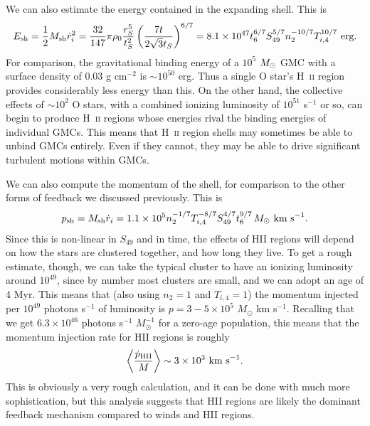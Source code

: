 We can also estimate the energy contained in the expanding shell. This is
\begin{equation}
E_{\rm sh} = \frac{1}{2} M_{\rm sh} \dot{r}_i^2 = \frac{32}{147}\pi \rho_0 \frac{r_S^5}{t_S^2} \left(\frac{7t}{2\sqrt{3} t_S}\right)^{6/7}
=8.1\times 10^{47} t_6^{6/7} S_{49}^{5/7} n_2^{-10/7} T_{i,4}^{10/7}\mbox{ erg}.
\end{equation}
For comparison, the gravitational binding energy of a $10^5$ $M_{\odot}$ GMC with a surface density of $0.03$ g cm$^{-2}$ is $\sim 10^{50}$ erg. Thus a single O star's H~\textsc{ii} region provides considerably less energy than this. On the other hand, the collective effects of $\sim 10^2$ O stars, with a combined ionizing luminosity of $10^{51}$ s$^{-1}$ or so, can begin to produce H~\textsc{ii} regions whose energies rival the binding energies of individual GMCs. This means that H~\textsc{ii} region shells may sometimes be able to unbind GMCs entirely. Even if they cannot, they may be able to drive significant turbulent motions within GMCs.

We can also compute the momentum of the shell, for comparison to the other forms of feedback we discussed previously. This is
\begin{equation}
p_{\rm sh} = M_{\rm sh} \dot{r}_i = 1.1\times 10^5 n_2^{-1/7} T_{i,4}^{-8/7} S_{49}^{4/7} t_6^{9/7} \, M_\odot\mbox{ km s}^{-1}.
\end{equation}
Since this is non-linear in $S_{49}$ and in time, the effects of HII regions will depend on how the stars are clustered together, and how long they live. To get a rough estimate, though, we can take the typical cluster to have an ionizing luminosity around $10^{49}$, since by number most clusters are small, and we can adopt an age of 4 Myr. This means that (also using $n_2 = 1$ and $T_{i,4} = 1$) the momentum injected per $10^{49}$ photons s$^{-1}$ of luminosity is $p = 3-5\times 10^5$ $M_\odot$ km s$^{-1}$. Recalling that we get $6.3\times 10^{46}$ photons s$^{-1}$ $M_\odot^{-1}$ for a zero-age population, this means that the momentum injection rate for HII regions is roughly
\begin{equation}
\left\langle\frac{\dot{p}_{\rm HII}}{M}\right\rangle \sim 3\times 10^3\mbox{ km s}^{-1}.
\end{equation}
This is obviously a very rough calculation, and it can be done with much more sophistication, but this analysis suggests that HII regions are likely the dominant feedback mechanism compared to winds and HII regions.

